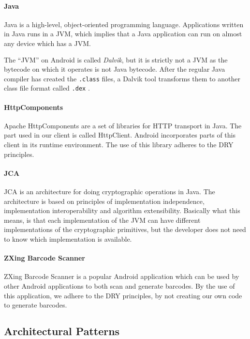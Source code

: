 \documentclass[pdftex,english,10pt,b5paper,twoside]{book}
\begin{document}
\paragraph{Java} Java is a high-level, object-oriented programming language.
Applications written in Java runs in a \ac{JVM}, which implies that a Java
application can run on almost any device which has a \ac{JVM}.

The ``\ac{JVM}'' on Android is called \emph{Dalvik}, but it is strictly not a
\acl{JVM} as the bytecode on which it operates is not Java bytecode.
After the regular Java compiler has created the \texttt{.class} files, a Dalvik
tool transforms them to another class file format called \texttt{.dex}
\cite{dalvik}.

\paragraph{HttpComponents} Apache HttpComponents are a set of libraries for
\ac{HTTP} transport in Java. The part used in our client is called HttpClient.
Android incorporates parts of this client in its runtime environment. The use
of this library adheres to the \ac{DRY} principles.

\paragraph{\ac{JCA}} \ac{JCA} is an architecture for doing cryptographic
operations in Java. The architecture is based on principles of implementation
independence, implementation interoperability and algorithm extensibility.
Basically what this means, is that each implementation of the \ac{JVM} can have
different implementations of the cryptographic primitives, but the developer
does not need to know which implementation is available.

\paragraph{ZXing Barcode Scanner} ZXing Barcode Scanner is a popular Android
application which can be used by other Android applications to both scan and
generate barcodes. By the use of this application, we adhere to the \ac{DRY}
principles, by not creating our own code to generate barcodes.

\subsection{Architectural Patterns}
\end{document}
